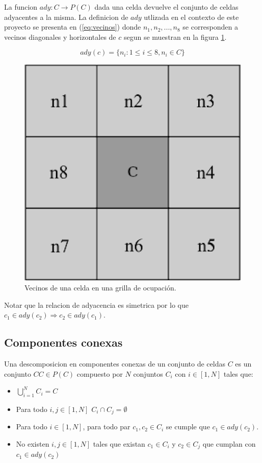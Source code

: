 La funcion $ady : C \rightarrow P(C)$ dada una celda devuelve el conjunto de
celdas adyacentes a la misma. La definicion de $ady$ utlizada en el contexto de
este proyecto se presenta en (\ref{eq:vecinos}) donde $n_1, n_2, ..., n_8$ se
corresponden a vecinos diagonales y horizontales de $c$ segun se muestran en la
figura \ref{fig:vecinos}.

\begin{equation} 
 ady(c)=\{n_i : 1\leq i \leq 8, n_i \in C\}
 \label{eq:vecinos}
\end{equation} 

\begin{figure}[H]
  \center
  \includegraphics[width=0.3\linewidth]{imagenes/vecinosSharp.png}
  \caption[Vecinos de una celda en una grilla de ocupación.]{Vecinos de una celda en una grilla de ocupación.}
  \label{fig:vecinos}
\end{figure} 

Notar que la relacion de adyacencia es simetrica por lo que $c_1 \in ady(c_2) \Rightarrow c_2 \in ady(c_1)$.

\subsection{Componentes conexas} \label{subsec:CompComp}
Una descomposicion en componentes conexas de un conjunto de
celdas $C$ es un conjunto $CC\in P(C)$ compuesto por $N$ conjuntos $C_i$ con
$i\in[1,N]$ tales que:
\begin{itemize}
  \item $\bigcup_{i=1}^{N}C_i = C$ 
  \item Para todo $i,j \in [1,N]$ $C_i\cap C_j = \emptyset$
  \item Para todo $i \in [1,N]$, para todo par $c_1,c_2 \in C_i$ se cumple que $c_1 \in ady(c_2)$.
  \item No existen $i,j \in [1,N]$ tales que existan $c_1 \in C_i$ y $c_2 \in C_j$ que cumplan con $c_1 \in ady(c_2)$ 
\end{itemize}

